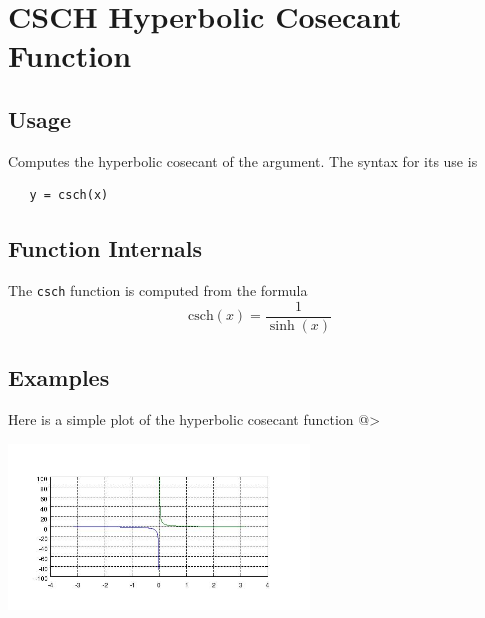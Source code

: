\section{CSCH Hyperbolic Cosecant Function}

\subsection{Usage}

Computes the hyperbolic cosecant of the argument.
The syntax for its use is
\begin{verbatim}
   y = csch(x)
\end{verbatim}
\subsection{Function Internals}

The \verb|csch| function is computed from the formula
\[
   \mathrm{csch}(x) = \frac{1}{\sinh(x)}
\]
\subsection{Examples}

Here is a simple plot of the hyperbolic cosecant function
@>


\centerline{\includegraphics[width=8cm]{cschplot}}

